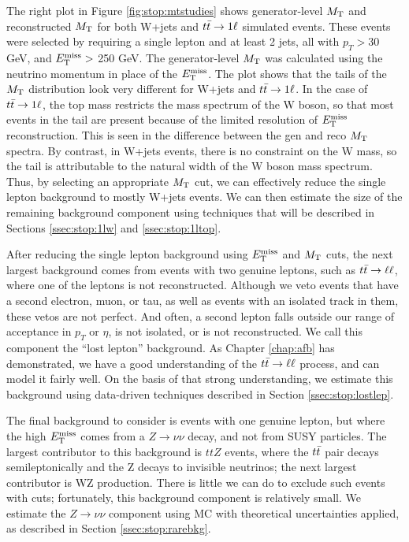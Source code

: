 The right plot in Figure \ref{fig:stop:mtstudies} shows generator-level $M_\text{T}$ and reconstructed $M_\text{T}$
for both W+jets and $t\bar{t} \rightarrow 1\ell$ simulated events. These
events were selected by requiring a single lepton and at least 2
jets, all with $p_T > 30$ GeV, and $E_\text{T}^\text{miss} >$ 250 GeV. The generator-level $M_\text{T}$ was
calculated using the neutrino momentum in place of the $E_\text{T}^\text{miss}$. The plot
shows that the tails of the $M_\text{T}$ distribution look very different for
W+jets and $t\bar{t} \rightarrow 1\ell$. In the case of $t\bar{t} \rightarrow 1\ell$, the top mass
restricts the mass spectrum of the W boson, so that most events in the
tail are present because of the limited resolution of $E_\text{T}^\text{miss}$
reconstruction. This is seen in the difference between the gen and reco
$M_\text{T}$ spectra. By contrast, in W+jets events, there is no constraint
on the W mass, so the tail is attributable to the natural width of the
W boson mass spectrum. Thus, by selecting an appropriate $M_\text{T}$ cut, we
can effectively reduce the single lepton background to mostly W+jets
events. We can then estimate the size of the remaining background
component using techniques that will be described in Sections
\ref{ssec:stop:1lw} and \ref{ssec:stop:1ltop}.

After reducing the single lepton background using $E_\text{T}^\text{miss}$ and $M_\text{T}$ cuts,
the next largest background comes from events with two genuine
leptons, such as $t\bar{t} \rightarrow \ell\ell$, where one of the leptons is not
reconstructed. Although we
veto events that have a second electron, muon, or tau, as well as
events with an isolated track in them, these vetos are
not perfect. And often, a second lepton falls outside our range of
acceptance in $p_T$ or $\eta$, is not isolated, or is not
reconstructed. We call this component the ``lost lepton''
background. As Chapter \ref{chap:afb} has demonstrated, we have a good
understanding of the $t\bar{t} \rightarrow \ell\ell$ process, and can model it fairly
well. On the basis of that strong understanding, we estimate this
background using data-driven techniques described in Section
\ref{ssec:stop:lostlep}.

The final background to consider is events with one genuine lepton,
but where the high $E_\text{T}^\text{miss}$ comes from a $Z \rightarrow \nu\nu$ decay,
and not from SUSY particles. The largest contributor to this
background is $ttZ$ events, where the $t\bar{t}$ pair decays
semileptonically and the Z decays to invisible neutrinos; the next
largest contributor is WZ production. There is little we can do to
exclude such events with cuts; fortunately, this background component
is relatively small. We estimate the $Z \rightarrow \nu\nu$
component using MC with theoretical uncertainties applied, as
described in Section \ref{ssec:stop:rarebkg}.

